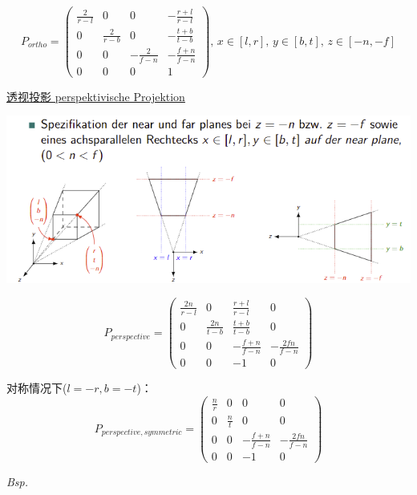 \documentclass[fleqn]{article}
\begin{document}
$$P_{ortho}=\begin{pmatrix}
    \frac{2}{r-l} & 0&0&-\frac{r+l}{r-l}\\
    0&\frac{2}{r-b}&0&-\frac{t+b}{t-b}\\
    0&0&-\frac{2}{f-n}&-\frac{f+n}{f-n}\\
    0&0&0&1
\end{pmatrix},\,x\in[l,r],\,y\in[b,t],\,z\in[-n,-f]$$

\noindent\underline{透视投影 perspektivische Projektion}

\begin{center}
    \includegraphics[scale=0.6]{9.png}
\end{center}

$$P_{perspective}=\begin{pmatrix}
    \frac{2n}{r-l}&0&\frac{r+l}{r-l}&0\\
    0&\frac{2n}{t-b}&\frac{t+b}{t-b}&0\\
    0&0&-\frac{f+n}{f-n}&-\frac{2fn}{f-n}\\
    0&0&-1&0
\end{pmatrix}$$

\indent\indent\indent\indent\indent 对称情况下($l=-r, b=-t$)：
$$P_{perspective,symmetric}=\begin{pmatrix}
    \frac{n}{r}&0&0&0\\
    0&\frac{n}{t}&0&0\\
    0&0&-\frac{f+n}{f-n}&-\frac{2fn}{f-n}\\
    0&0&-1&0
\end{pmatrix}$$

\noindent\textit{Bsp.}
\end{document}
